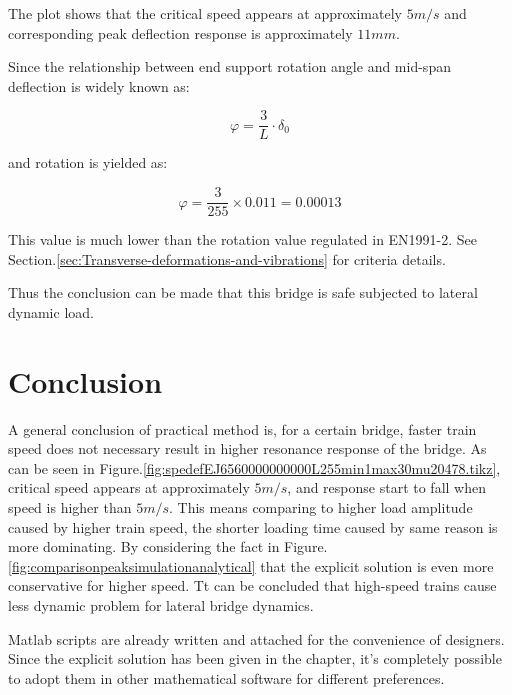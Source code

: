 The plot shows that the critical speed appears at approximately $5m/s$ and corresponding peak deflection response is approximately $11mm$. 

Since the relationship between end support rotation angle and mid-span deflection is widely known as:

$$ \varphi = \frac{3}{L}\cdot \delta_0  $$

and rotation is yielded as:

$$ \varphi = \frac{3}{255}\times 0.011 = 0.00013 $$

This value is much lower than the rotation value regulated in EN1991-2. See Section.\ref{sec:Transverse-deformations-and-vibrations} for criteria details.

Thus the conclusion can be made that this bridge is safe subjected to lateral dynamic load.

\section{Conclusion}

A general conclusion of practical method is, for a certain bridge, faster train speed does not necessary result in higher resonance response of the bridge. As can be seen in Figure.\ref{fig:spedefEJ6560000000000L255min1max30mu20478.tikz}, critical speed appears at approximately $5m/s$, and response start to fall when speed is higher than $5m/s$. This means comparing to higher load amplitude caused by higher train speed, the shorter loading time caused by same reason is more dominating. By considering the fact in Figure.\ref{fig:comparisonpeaksimulationanalytical} that the explicit solution is even more conservative for higher speed. Tt can be concluded that high-speed trains cause less dynamic problem for lateral bridge dynamics.

Matlab scripts are already written and attached for the convenience of designers. Since the explicit solution has been given in the chapter, it's completely possible to adopt them in other mathematical software for different preferences.